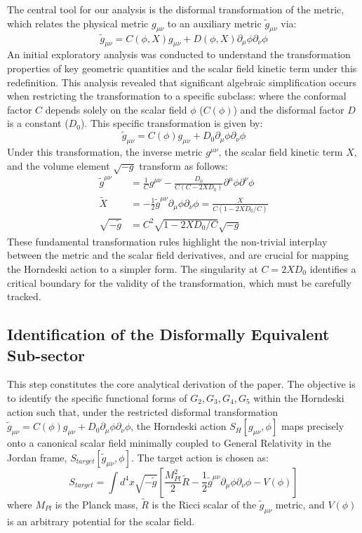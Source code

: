\documentclass[twocolumn]{aastex631}
\begin{document}
The central tool for our analysis is the disformal transformation of the metric, which relates the physical metric $g_{\mu\nu}$ to an auxiliary metric $\tilde{g}_{\mu\nu}$ via:
\begin{equation}
\tilde{g}_{\mu\nu} = C(\phi, X) g_{\mu\nu} + D(\phi, X) \partial_\mu\phi \partial_\nu\phi
\end{equation}
An initial exploratory analysis was conducted to understand the transformation properties of key geometric quantities and the scalar field kinetic term under this redefinition. This analysis revealed that significant algebraic simplification occurs when restricting the transformation to a specific subclass: where the conformal factor $C$ depends solely on the scalar field $\phi$ ($C(\phi)$) and the disformal factor $D$ is a constant ($D_0$). This specific transformation is given by:
\begin{equation}
\tilde{g}_{\mu\nu} = C(\phi) g_{\mu\nu} + D_0 \partial_\mu\phi \partial_\nu\phi
\end{equation}
Under this transformation, the inverse metric $g^{\mu\nu}$, the scalar field kinetic term $X$, and the volume element $\sqrt{-g}$ transform as follows:
\begin{align*}
\tilde{g}^{\mu\nu} &= \frac{1}{C}g^{\mu\nu} - \frac{D_0}{C(C-2XD_0)}\partial^\mu\phi\partial^\nu\phi \\
\tilde{X} &= -\frac{1}{2}\tilde{g}^{\mu\nu}\partial_\mu\phi\partial_\nu\phi = \frac{X}{C(1-2XD_0/C)} \\
\sqrt{-\tilde{g}} &= C^2 \sqrt{1 - 2XD_0/C} \sqrt{-g}
\end{align*}
These fundamental transformation rules highlight the non-trivial interplay between the metric and the scalar field derivatives, and are crucial for mapping the Horndeski action to a simpler form. The singularity at $C=2XD_0$ identifies a critical boundary for the validity of the transformation, which must be carefully tracked.

\subsection{Identification of the Disformally Equivalent Sub-sector}
This step constitutes the core analytical derivation of the paper. The objective is to identify the specific functional forms of $G_2, G_3, G_4, G_5$ within the Horndeski action such that, under the restricted disformal transformation $\tilde{g}_{\mu\nu} = C(\phi) g_{\mu\nu} + D_0 \partial_\mu\phi \partial_\nu\phi$, the Horndeski action $S_H[g_{\mu\nu}, \phi]$ maps precisely onto a canonical scalar field minimally coupled to General Relativity in the Jordan frame, $S_{target}[\tilde{g}_{\mu\nu}, \phi]$. The target action is chosen as:
\begin{equation}
S_{target} = \int d^4x \sqrt{-\tilde{g}} \left[ \frac{M_{Pl}^2}{2} \tilde{R} - \frac{1}{2} \tilde{g}^{\mu\nu} \partial_\mu \phi \partial_\nu \phi - V(\phi) \right]
\end{equation}
where $M_{Pl}$ is the Planck mass, $\tilde{R}$ is the Ricci scalar of the $\tilde{g}_{\mu\nu}$ metric, and $V(\phi)$ is an arbitrary potential for the scalar field.
\end{document}
